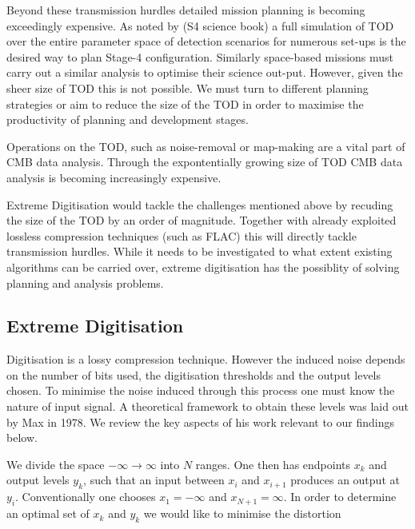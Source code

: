 \documentclass[apj]{emulateapj}
\begin{document}

Beyond these transmission hurdles detailed mission planning is becoming exceedingly expensive. As noted by (S4 science book) a full simulation of TOD over the entire parameter space of detection scenarios for numerous set-ups is the desired way to plan Stage-4 configuration. Similarly space-based missions must carry out a similar analysis to optimise their science out-put. However, given the sheer size of TOD this is not possible. We must turn to different planning strategies or aim to reduce the size of the TOD in order to maximise the productivity of planning and development stages.

Operations on the TOD, such as noise-removal or map-making are a vital part of CMB data analysis. Through the expontentially growing size of TOD CMB data analysis is becoming increasingly expensive.


Extreme Digitisation would tackle the challenges mentioned above by recuding the size of the TOD by an order of magnitude. Together with already exploited lossless compression techniques (such as FLAC) this will directly tackle transmission hurdles. While it needs to be investigated to what extent existing algorithms can be carried over, extreme digitisation has the possiblity of solving planning and analysis problems.

\subsection{Extreme Digitisation}
\label{subsec:extremedigitisation}


Digitisation is a lossy compression technique. However the induced noise depends on the number of bits used, the digitisation thresholds and the output levels chosen. To minimise the noise induced through this process one must know the nature of input signal. A theoretical framework to obtain these levels was laid out by Max in 1978. We review the key aspects of his work relevant to our findings below.

We divide the space $-\infty \to \infty$ into $N$ ranges. One then has endpoints $x_k$ and output levels $y_k$, such that an input between $x_i$ and $x_{i+1}$ produces an output at $y_i$. Conventionally one chooses $x_{1} = -\infty$ and $x_{N+1} = \infty$. In order to determine an optimal set of $x_k$ and $y_k$ we would like to minimise the distortion
\end{document}

